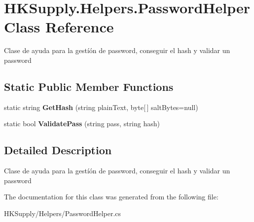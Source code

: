 \hypertarget{class_h_k_supply_1_1_helpers_1_1_password_helper}{}\section{H\+K\+Supply.\+Helpers.\+Password\+Helper Class Reference}
\label{class_h_k_supply_1_1_helpers_1_1_password_helper}


Clase de ayuda para la gestíón de password, conseguir el hash y validar un password  


\subsection*{Static Public Member Functions}
\begin{DoxyCompactItemize}
\item 
\mbox{\label{class_h_k_supply_1_1_helpers_1_1_password_helper_aeaf390a6e70bd83cc7eb210d3d07a89d}} 
static string {\bfseries Get\+Hash} (string plain\+Text, byte\mbox{[}$\,$\mbox{]} salt\+Bytes=null)
\item 
\mbox{\label{class_h_k_supply_1_1_helpers_1_1_password_helper_aeb64d915984f589049e1a3fa9eb91042}} 
static bool {\bfseries Validate\+Pass} (string pass, string hash)
\end{DoxyCompactItemize}


\subsection{Detailed Description}
Clase de ayuda para la gestíón de password, conseguir el hash y validar un password 



The documentation for this class was generated from the following file\+:\begin{DoxyCompactItemize}
\item 
H\+K\+Supply/\+Helpers/Password\+Helper.\+cs\end{DoxyCompactItemize}
